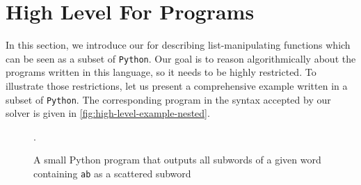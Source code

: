 \section{High Level For Programs}
\label{sec:high_level}

\AP In this section, we introduce our  for
describing list-manipulating functions which can be seen as a subset of
\texttt{Python}. Our goal is to reason algorithmically about the programs
written in this language, so it needs to be highly restricted. To illustrate
those restrictions, let us present a comprehensive example written in a subset
of \texttt{Python}. The corresponding program in the syntax accepted by our
solver is given in \cref{fig:high-level-example-nested}.

\begin{figure}[h]
    \centering
    
    \caption{A small Python program that
        outputs all subwords of a given word containing \texttt{ab}
        as a scattered subword}.
    \label{fig:python-example-nested}
\end{figure}

